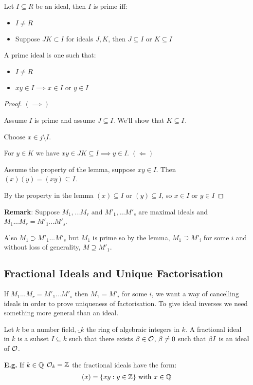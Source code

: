 \documentclass[11pt]{article}
\begin{document}
\begin{lemma}
Let $I \subseteq R$ be an ideal, then $I$ is prime iff:
	\begin{itemize}
		\item{$I \neq R$}
		\item{Suppose $JK \subset I$ for ideals $J,K$, then $J \subseteq I$ or $K \subseteq I$}
	\end{itemize}
\end{lemma}


\begin{defn}
A prime ideal is one such that:

	\begin{itemize}
		\item{$I \neq R$}
		\item{$xy \in I \implies x \in I $ or $y \in I$}
	\end{itemize}
\end{defn}										    									    
\begin{proof}
	$(\implies)$ 
	\spa

	Assume $I$ is prime and assume $J \subseteq I$.
	We'll show that $K \subseteq I$.

	Choose $x \in j $\textbackslash$ I$.
	\spa

	For $y \in K$ we have $xy \in JK \subseteq I \implies y \in I$.
	\spac 
	$(\Longleftarrow)$
	\spa

	Assume the property of the lemma, suppose $xy \in I$. Then $(x)(y) = (xy) \subseteq I$.

	By the property in the lemma $(x) \subseteq I$ or $(y) \subseteq I$, so $x \in I$ or $y \in I$
\end{proof}
\spa							    					    
\textbf{Remark}: Suppose $M_1, \dots M_r $ and $M'_1, \dots M'_s$ are maximal ideals and $M_1 \dots M_r = M'_1 \dots M'_s $.

Also 
$M_1 \supset M'_1 \dots M'_s$ but $M_1$ is prime so by the lemma, 
$M_1 \supseteq M'_i$ for some $i$ and without loss of generality, $M \supseteq M'_1$.


\subsection{Fractional Ideals and Unique Factorisation}
If $M_1\dots M_r = M'_1\dots M'_s$ then $M_1 = M'_i$ for some $i$, we want a way of cancelling ideals in order to prove uniqueness of factorisation.
To give ideal inverses we need something more general than an ideal.

\begin{defn}
Let $k$ be a number field, $\ring_k$ the ring of algebraic integers in $k$. A fractional ideal in $k$ is a subset $I \subseteq k $ such that there exists $\beta \in \mathcal{O}$, $\beta \neq 0$ such that $\beta I$ is an ideal of $\mathcal{O}$.
\end{defn}
\spa
\textbf{E.g.} If $k \in \mathbb{Q} $\hspace{7pt} $\mathcal{O}_k =\mathbb{Z}$ the fractional ideals have the form:
\begin{align*}
	(x) = \{ xy : y \in \mathbb{Z} \} \text{ with } x \in \mathbb{Q}
\end{align*}
\end{document}
